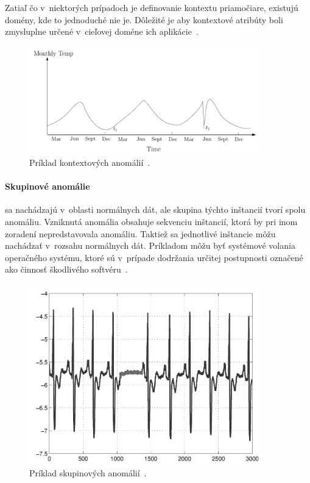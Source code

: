 \documentclass[a4paper,twoside,slovak,12pt,appendix]{article}
\begin{document}
Zatiaľ čo v~niektorých prípadoch je definovanie kontextu priamočiare, existujú
domény, kde to jednoduché nie je. Dôležité je aby kontextové atribúty boli
zmysluplne určené v~cieľovej doméne ich aplikácie~\cite{Chandola2009}.

\begin{figure}[htbp]
  \centering
  \includegraphics[width=0.9\textwidth]{contextual_anomalies.png}
  \caption[Príklad kontextových anomálií.]{Príklad kontextových anomálií~\cite{Chandola2009}.}
  \label{fig:contextual-anomalies}
\end{figure}

\paragraph{Skupinové anomálie} sa nachádzajú v~oblasti normálnych dát, ale
skupina týchto inštancií tvorí spolu anomáliu. Vzniknutá anomália obsahuje
sekvenciu inštancií, ktorá by pri inom zoradení nepredstavovala anomáliu.
Taktiež sa jednotlivé inštancie môžu nachádzať v~rozsahu normálnych dát.
Príkladom môžu byť systémové volania operačného systému, ktoré sú v~prípade
dodržania určitej postupnosti označené ako činnosť škodlivého
softvéru~\cite{Chandola2009}.

\begin{figure}[H]
  \centering
  \includegraphics[width=0.9\textwidth]{collective_anomalies.png}
  \caption[Príklad skupinových anomálií.]{Príklad skupinových anomálií~\cite{Chandola2009}.}
  \label{fig:collective-anomalies}
\end{figure}
\end{document}
